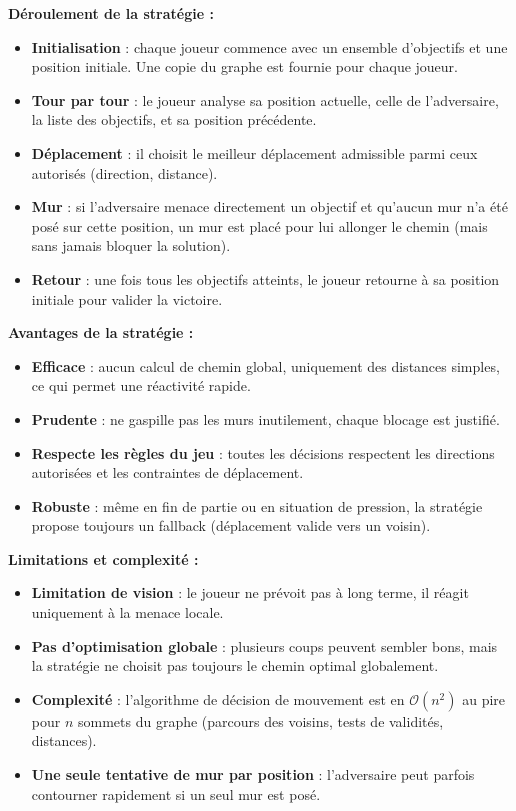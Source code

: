 \vspace{0.3cm}

\noindent\textbf{Déroulement de la stratégie :}
\begin{itemize}
\item \textbf{Initialisation} : chaque joueur commence avec un ensemble d'objectifs et une position initiale. Une copie du graphe est fournie pour chaque joueur.
\item \textbf{Tour par tour} : le joueur analyse sa position actuelle, celle de l'adversaire, la liste des objectifs, et sa position précédente.
\item \textbf{Déplacement} : il choisit le meilleur déplacement admissible parmi ceux autorisés (direction, distance).
\item \textbf{Mur} : si l'adversaire menace directement un objectif et qu'aucun mur n'a été posé sur cette position, un mur est placé pour lui allonger le chemin (mais sans jamais bloquer la solution).
\item \textbf{Retour} : une fois tous les objectifs atteints, le joueur retourne à sa position initiale pour valider la victoire.
\end{itemize}

\vspace{0.3cm}

\noindent\textbf{Avantages de la stratégie :}
\begin{itemize}
\item \textbf{Efficace} : aucun calcul de chemin global, uniquement des distances simples, ce qui permet une réactivité rapide.
\item \textbf{Prudente} : ne gaspille pas les murs inutilement, chaque blocage est justifié.
\item \textbf{Respecte les règles du jeu} : toutes les décisions respectent les directions autorisées et les contraintes de déplacement.
\item \textbf{Robuste} : même en fin de partie ou en situation de pression, la stratégie propose toujours un fallback (déplacement valide vers un voisin).
\end{itemize}

\vspace{0.3cm}

\noindent\textbf{Limitations et complexité :}
\begin{itemize}
\item \textbf{Limitation de vision} : le joueur ne prévoit pas à long terme, il réagit uniquement à la menace locale.
\item \textbf{Pas d'optimisation globale} : plusieurs coups peuvent sembler bons, mais la stratégie ne choisit pas toujours le chemin optimal globalement.
\item \textbf{Complexité} : l'algorithme de décision de mouvement est en $\mathcal{O}(n^2)$ au pire pour $n$ sommets du graphe (parcours des voisins, tests de validités, distances).
\item \textbf{Une seule tentative de mur par position} : l’adversaire peut parfois contourner rapidement si un seul mur est posé.
\end{itemize}


